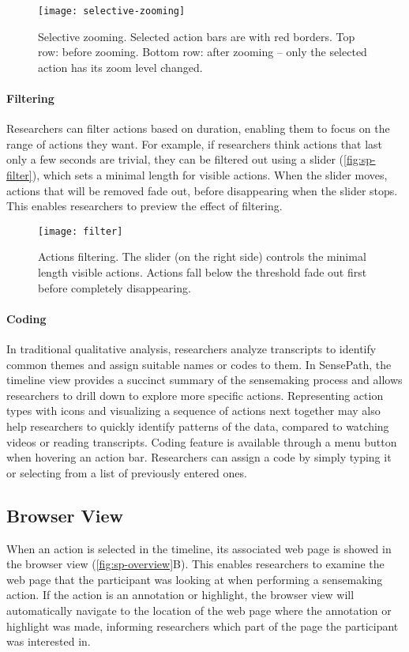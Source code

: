 \begin{figure}[!htb]
\centering
\texttt{[image: selective-zooming]}
\caption{Selective zooming. Selected action bars are with red borders. Top row: before zooming. Bottom row: after zooming -- only the selected action has its zoom level changed.}
\label{fig:sp-selective-zooming}
\end{figure}

\paragraph{Filtering}
Researchers can filter actions based on duration, enabling them to focus on the range of actions they want. For example, if researchers think actions that last only a few seconds are trivial, they can be filtered out using a slider (\autoref{fig:sp-filter}), which sets a minimal length for visible actions. When the slider moves, actions that will be removed fade out, before disappearing when the slider stops. This enables researchers to preview the effect of filtering.

\begin{figure}[!htb]
\centering
\texttt{[image: filter]}
\caption{Actions filtering. The slider (on the right side) controls the minimal length visible actions. Actions fall below the threshold fade out first before completely disappearing.}
\label{fig:sp-filter}
\end{figure}

\paragraph{Coding}
In traditional qualitative analysis, researchers analyze transcripts to identify common themes and assign suitable names or codes to them. In SensePath, the timeline view provides a succinct summary of the sensemaking process and allows researchers to drill down to explore more specific actions. Representing action types with icons and visualizing a sequence of actions next together may also help researchers to quickly identify patterns of the data, compared to watching videos or reading transcripts. Coding feature is available through a menu button when hovering an action bar. Researchers can assign a code by simply typing it or selecting from a list of previously entered ones.

\subsection{Browser View}
\label{sub:webpage}
When an action is selected in the timeline, its associated web page is showed in the browser view (\autoref{fig:sp-overview}B). This enables researchers to examine the web page that the participant was looking at when performing a sensemaking action. If the action is an annotation or highlight, the browser view will automatically navigate to the location of the web page where the annotation or highlight was made, informing researchers which part of the page the participant was interested in.

